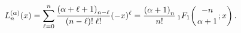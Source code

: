 \[\mathop{L^{(\alpha)}_{n}\/}\nolimits\!\left(x\right)=\sum_{\ell=0}^{n}\frac{%
\left(\alpha+\ell+1\right)_{n-\ell}}{(n-\ell)!\;\ell!}(-x)^{\ell}=\frac{\left(%
\alpha+1\right)_{n}}{n!}\mathop{{{}_{1}F_{1}}\/}\nolimits\!\left({-n\atop%
\alpha+1};x\right).\]